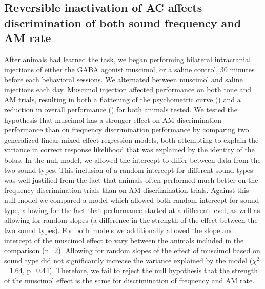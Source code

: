 \subsection{Reversible inactivation of AC affects discrimination of both sound
frequency and AM rate} After animals had learned the task, we began performing
bilateral intracranial injections of either the GABA agonist muscimol, or a
saline control, 30 minutes before each behavioral sessions.
%
We alternated between muscimol and saline injections each day. 
%
Muscimol injection affected performance on both tone and AM trials, resulting
in both a flattening of the psychometric curve (\fig{\amodPsychometrics}) and a
reduction in overall performance (\fig{\amodCorrect}) for both animals tested. 
%
We tested the hypothesis that muscimol has a stronger effect on AM
discrimination performance than on frequency discrimination performance by
comparing two generalized linear mixed effect regression models, both attempting
to explain the variance in correct response likelihood that was explained by the
identity of the bolus. 
%
In the null model, we allowed the intercept to differ between data from the two
sound types.
%
This inclusion of a random intercept for different sound types was
well-justified from the fact that animals often performed much better on the
frequency discrimination trials than on AM discrimination trials.
%
Against this null model we compared a model which allowed both random
intercept for sound type, allowing for the fact that performance started
at a different level, as well as allowing for random slopes (a difference in
the strength of the effect between the two sound types).
%
For both models we additionally allowed the slope and intercept of the muscimol
effect to vary between the animals included in the comparison (n=2). 
%
Allowing for random slopes of the effect of muscimol based on sound type did
not significantly increase the variance explained by the model
($\chi^{2}$=1.64, p=0.44).
%
Therefore, we fail to reject the null hypothesis that the strength of the
muscimol effect is the same for discrimination of frequency and AM rate. 

